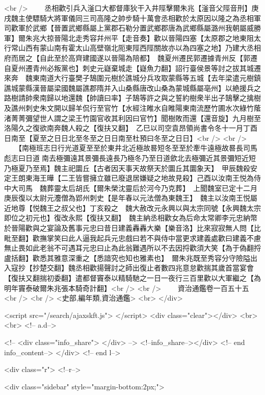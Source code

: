 <br />
　　丞相歡引兵入滏口大都督庫狄干入井陘擊爾朱兆【滏音父陘音刑】庚戌魏主使驃騎大將軍儀同三司高隆之帥步騎十萬會丞相歡於太原因以隆之為丞相軍司歡軍於武鄉【晉置武鄉縣屬上黨郡石勒分置武鄉郡唐為武鄉縣屬潞州我朝屬威勝軍】爾朱兆大掠晉陽北走秀容幷州平【走音奏】歡以晉陽四塞【太原郡之地東阻太行常山西有蒙山南有霍太山高壁嶺北阨東陘西陘關故亦以為四塞之地】乃建大丞相府而居之【自此至於高齊建國遂以晉陽為陪都】　魏夏州遷民郭遷據青州反【郭遷自夏州遷青州必叛黨也】刺史元嶷棄城走【嶷魚力翻】詔行臺侯景等討之拔其城遷來奔　魏東南道大行臺樊子鵠圍元樹於譙城分兵攻取蒙縣等五城【去年梁遣元樹鎮譙城蒙縣漢晉屬梁國魏屬譙郡隋并入山桑縣唐改山桑為蒙城縣屬亳州】以絶援兵之路樹請帥衆南歸以地還魏【帥讀曰率】子鵠等許之與之誓約樹衆半出子鵠擊之擒樹及譙州刺史朱文開以歸羊侃行至官竹【水經注睢水自睢陽東南流歷竹圃水次綠竹䕃渚菁菁彌望世人謂之梁王竹園官收其利因曰官竹】聞樹敗而還【還音旋】九月樹至洛陽久之復欲南奔魏人殺之【復扶又翻】　乙巳以司空袁昂領尚書令冬十一月丁酉日南至【夏至之日日北至冬至之日日南至杜預曰冬至之日日】<br />
<br />
　　【南極班志日行光道夏至至於東井北近極故晷短冬至至於牽牛遠極故晷長司馬彪志曰日道南去極彌遠其景彌長遠長乃極冬乃至日道歛北去極彌近其景彌短近短乃極夏乃至焉】魏主祀圜丘【古者因天事天故祭天於圜丘其圜象天】　甲辰魏殺安定王朗東海王曄【二王皆嘗擁立雖已廢退居嫌疑之地故見殺】己酉以汝南王悦為侍中大司馬　魏葬靈太后胡氏【爾朱榮沈靈后於河今乃克葬】　上聞魏室已定十二月庚辰復以太尉元灋僧為郢州刺史【是年春以元法僧為東魏王】　魏主以汝南王悦屬近地尊【悦魏王之叔父也】丁亥殺之　魏大赦改元永興以與太宗同號【永興魏太宗即位之初元也】復改永熙【復扶又翻】　魏主納丞相歡女為后命太常卿李元忠納幣於晉陽歡與之宴論及舊事元忠曰昔日建義轟轟大樂【樂音洛】比來寂寂無人問【比毗至翻】歡撫掌笑曰此人逼我起兵元忠戲曰若不與侍中當更求建義處歡曰建義不慮無止畏如此老翁不可遇耳元忠曰止為此翁難遇所以不去因捋歡須大笑【為于偽翻捋盧括翻】歡悉其雅意深重之【悉諳究也知也雅素也】　爾朱兆既至秀容分守險隘出入寇抄【抄楚交翻】魏丞相歡揚聲討之師出復止者數四兆意怠歡揣其歲首當宴會【復扶又翻揣初委翻】遣都督竇泰以精騎馳之一日一夜行三百里歡以大軍繼之【為明年竇泰破爾朱兆張本騎奇計翻】<br />
<br />
　　資治通鑑卷一百五十五<br />
<br />
<史部,編年類,資治通鑑>  <br>
   </div> 

<script src="/search/ajaxskft.js"> </script>
 <div class="clear"></div>
<br>
<br>
 <!-- a.d-->

 <!--
<div class="info_share">
</div> 
-->
 <!--info_share--></div>   <!-- end info_content-->
  </div> <!-- end l-->

<div class="r">   <!--r-->



<div class="sidebar"  style="margin-bottom:2px;">

